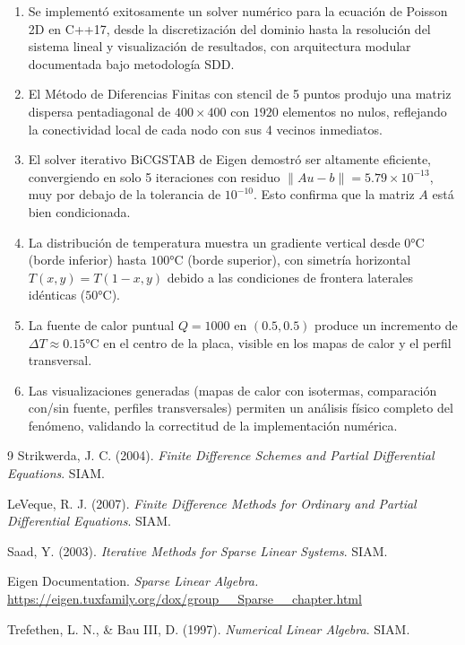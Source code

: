 \documentclass[12pt,a4paper]{article}
\theoremstyle{definition}
\newcommand{\norm}[1]{\|#1\|}
\begin{document}
\begin{enumerate}
    \item Se implement\'{o} exitosamente un solver num\'{e}rico para la ecuaci\'{o}n de Poisson 2D en C++17, desde la discretizaci\'{o}n del dominio hasta la resoluci\'{o}n del sistema lineal y visualizaci\'{o}n de resultados, con arquitectura modular documentada bajo metodolog\'{i}a SDD.

    \item El M\'{e}todo de Diferencias Finitas con stencil de 5 puntos produjo una matriz dispersa pentadiagonal de $400 \times 400$ con $1920$ elementos no nulos, reflejando la conectividad local de cada nodo con sus 4 vecinos inmediatos.

    \item El solver iterativo BiCGSTAB de Eigen demostr\'{o} ser altamente eficiente, convergiendo en solo 5 iteraciones con residuo $\norm{Au - b} = 5.79 \times 10^{-13}$, muy por debajo de la tolerancia de $10^{-10}$. Esto confirma que la matriz $A$ est\'{a} bien condicionada.

    \item La distribuci\'{o}n de temperatura muestra un gradiente vertical desde $0\text{°C}$ (borde inferior) hasta $100\text{°C}$ (borde superior), con simetr\'{i}a horizontal $T(x,y) = T(1-x,y)$ debido a las condiciones de frontera laterales id\'{e}nticas ($50\text{°C}$).

    \item La fuente de calor puntual $Q = 1000$ en $(0.5, 0.5)$ produce un incremento de $\Delta T \approx 0.15\text{°C}$ en el centro de la placa, visible en los mapas de calor y el perfil transversal.

    \item Las visualizaciones generadas (mapas de calor con isotermas, comparaci\'{o}n con/sin fuente, perfiles transversales) permiten un an\'{a}lisis f\'{i}sico completo del fen\'{o}meno, validando la correctitud de la implementaci\'{o}n num\'{e}rica.
\end{enumerate}

\begin{thebibliography}{9}
 Strikwerda, J. C. (2004). \textit{Finite Difference Schemes and Partial Differential Equations}. SIAM.

 LeVeque, R. J. (2007). \textit{Finite Difference Methods for Ordinary and Partial Differential Equations}. SIAM.

 Saad, Y. (2003). \textit{Iterative Methods for Sparse Linear Systems}. SIAM.

 Eigen Documentation. \textit{Sparse Linear Algebra.} \url{https://eigen.tuxfamily.org/dox/group__Sparse__chapter.html}

 Trefethen, L. N., \& Bau III, D. (1997). \textit{Numerical Linear Algebra}. SIAM.
\end{thebibliography}
\end{document}
